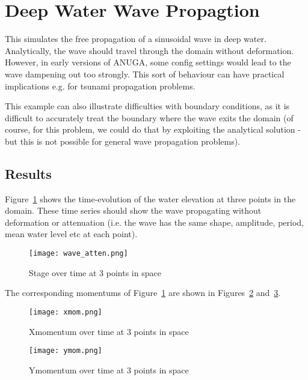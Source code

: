 \section{Deep Water Wave Propagtion}
This simulates the free propagation of a sinusoidal wave in deep water. Analytically, the wave should travel through the domain without deformation. However, in early versions of ANUGA, some config settings would lead to the wave dampening out too strongly. This sort of behaviour can have practical implications e.g. for tsunami propagation problems.  

This example can also illustrate difficulties with boundary conditions, as it is difficult to accurately treat the boundary where the wave exits the domain (of course, for this problem, we could do that by exploiting the analytical solution - but this is not possible for general wave propagation problems).

\subsection{Results}
Figure~\ref{fig:stagewave} shows the time-evolution of the water elevation at three points in the domain. These time series should show the wave propagating without deformation or attenuation (i.e. the wave has the same shape, amplitude, period, mean water level etc at each point).  
\begin{figure}[h]
\begin{center}
\texttt{[image: wave\_atten.png]}
\caption{Stage over time at 3 points in space}
\label{fig:stagewave}
\end{center}
\end{figure}


The corresponding momentums of Figure~\ref{fig:stagewave} are shown in Figures~\ref{fig:xmom} and~\ref{fig:ymom}.
\begin{figure}[h]
\begin{center}
\texttt{[image: xmom.png]}
\caption{Xmomentum over time at 3 points in space}
\label{fig:xmom}
\end{center}
\end{figure}
\begin{figure}[h]
\begin{center}
\texttt{[image: ymom.png]}
\caption{Ymomentum over time at 3 points in space}
\label{fig:ymom}
\end{center}
\end{figure}



\endinput
